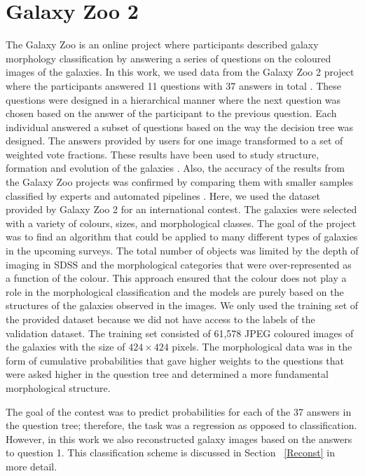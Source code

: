 \documentclass[a4paper,fleqn,usenatbib]{mnras}
\begin{document}
 \section{Galaxy Zoo 2}
 
The Galaxy Zoo is an online project where participants described galaxy morphology classification by answering a series of questions on the coloured images of the galaxies. In this work, we used data from the Galaxy Zoo 2 project where the participants answered 11 questions with 37 answers in total \citep{willett2013galaxy}. These questions were designed in a hierarchical manner where the next question was chosen based on the answer of the participant to the previous question. Each individual answered a subset of questions based on the way the decision tree was designed. The answers provided by users for one image transformed to a set of weighted vote fractions. These results have been used to study structure, formation and evolution of the galaxies \citep[e.g.,][]{skibba2009galaxy}. Also, the accuracy of the results from the Galaxy Zoo projects was confirmed by comparing them with smaller samples classified by experts and automated pipelines  \citep{bamford2009galaxy, willett2013galaxy}. Here, we used the dataset provided by Galaxy Zoo 2 for an international contest. The galaxies were selected with a variety of colours, sizes, and morphological classes. The goal of the project was to find an algorithm that could be applied to many different types of galaxies in the upcoming surveys. The total number of objects was limited by the depth of imaging in SDSS and the morphological categories that were over-represented as a function of the colour. This approach ensured that the colour does not play a role in the morphological classification and the models are purely based on the structures of the galaxies observed in the images. We only used the training set of the provided dataset because we did not have access to the labels of the validation dataset. The training set consisted of 61,578 JPEG coloured images of the galaxies with the size of $424 \times 424$ pixels. The morphological data was in the form of cumulative probabilities that gave higher weights to the questions that were asked higher in the question tree and determined a more fundamental morphological structure. 
 
 The goal of the contest was to predict probabilities for each of the 37 answers in the question tree; therefore, the task was a regression as opposed to classification. However, in this work we also reconstructed galaxy images based on the answers to question 1. This classification scheme is discussed in Section ~\ref{Reconst} in more detail. 
\end{document}
